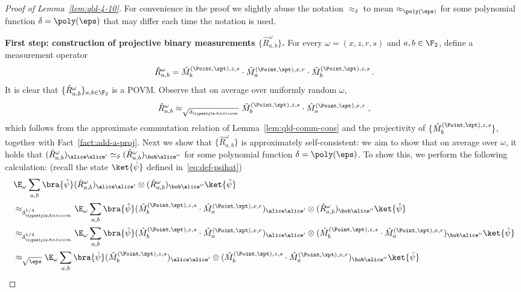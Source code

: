 \begin{proof}[Proof of Lemma~\ref{lem:qld-4-10}]
For convenience in the proof we slightly abuse the notation $\approx_\delta$ to mean $\approx_{\poly(\eps)}$ for some polynomial function $\delta=\poly(\eps)$ that may differ each time the notation is used. 

\textbf{First step: construction of projective binary measurements $\{ \hat{R}^\omega_{a,b} \}$.}
	For every $\omega = (x,z,r,s)$ and $a,b \in \F_2$, define a measurement operator
	\[
		\hat{R}^\omega_{a,b} = \hat{M}^{(\Point,\zpt),z,s}_{b} \cdot \hat{M}^{(\Point,\xpt),x,r}_{a} \cdot \hat{M}^{(\Point,\zpt),z,s}_{b} \,.
	\]
	It is clear that $\{ \hat{R}^\omega_{a,b} \}_{a,b\in\F_2}$ is a POVM. Observe that on average over uniformly random $\omega$, 
	\begin{align}
	\label{eq:qld-r-2}
	\hat{R}^\omega_{a,b} \approx_{\sqrt{\delta_{\acom}}} \hat{M}^{(\Point,\zpt),z,s}_{b} \cdot \hat{M}^{(\Point,\xpt),x,r}_{a}\;,
	\end{align}
	which follows from the approximate commutation relation of Lemma~\ref{lem:qld-comm-cons} and the projectivity of $\{ \hat{M}^{(\Point,\zpt),z,s}_{b} \}$, together with Fact~\ref{fact:add-a-proj}. Next we show that $\{ \hat{R}^\omega_{a,b} \}$ is approximately self-consistent:  we aim to show that on average over $\omega$, it holds that $(\hat{R}^\omega_{a,b})_{\alice \alice'} \simeq_\delta (\hat{R}^\omega_{a,b})_{\bob \alice''}$ for some polynomial function $\delta = \poly(\eps)$. To show this, we perform the following calculation: (recall the state $\ket{\hat{\psi}}$ defined in~\eqref{eq:def-psihat})
	\begin{align}
		&\E_\omega \sum_{a,b} \bra{\hat{\psi}} (\hat{R}^\omega_{a,b})_{\alice \alice'} \otimes (\hat{R}^\omega_{a,b})_{\bob \alice''} \ket{\hat{\psi}} \notag \\
		&\approx_{\delta_{\acom}^{1/4}} \E_\omega \sum_{a,b} \bra{\hat{\psi}} (\hat{M}^{(\Point,\zpt),z,s}_{b} \cdot \hat{M}^{(\Point,\xpt),x,r}_{a})_{\alice \alice'} \otimes (\hat{R}^\omega_{a,b})_{\bob \alice''} \ket{\hat{\psi}} \label{eq:qld-rw-self-cons-1} \\
		&\approx_{\delta_{\acom}^{1/4}} \E_\omega \sum_{a,b} \bra{\hat{\psi}} (\hat{M}^{(\Point,\zpt),z,s}_{b} \cdot \hat{M}^{(\Point,\xpt),x,r}_{a})_{\alice \alice'} \otimes (\hat{M}^{(\Point,\zpt),z,s}_{b} \cdot \hat{M}^{(\Point,\xpt),x,r}_{a})_{\bob \alice''} \ket{\hat{\psi}} \label{eq:qld-rw-self-cons-2} \\		
		&\approx_{\sqrt{\eps}} \E_\omega \sum_{a,b} \bra{\hat{\psi}} (\hat{M}^{(\Point,\zpt),z,s}_{b})_{\alice \alice'} \otimes (\hat{M}^{(\Point,\zpt),z,s}_{b} \cdot \hat{M}^{(\Point,\xpt),x,r}_{a})_{\bob \alice''} \ket{\hat{\psi}} \label{eq:qld-rw-self-cons-3} \\

\end{align}
\end{proof}
